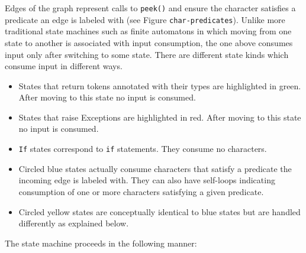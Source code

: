 \begin{itemize}
Edges of the graph represent calls to \texttt{peek()} and ensure the character satisfies a predicate an edge is labeled with (see Figure \texttt{char-predicates}). Unlike more traditional state machines such as finite automatons in which moving from one state to another is associated with input consumption, the one above consumes input only after switching to some state. There are different state kinds which consume input in different ways.
\begin{itemize}
\item States that return tokens annotated with their types are highlighted in green. After moving to this state no input is consumed.
\item States that raise Exceptions are highlighted in red. After moving to this state no input is consumed.
\item \texttt{If} states correspond to \texttt{if} statements. They consume no characters.
\item Circled blue states actually consume characters that satisfy a predicate the incoming edge is labeled with. They can also have self-loops indicating consumption of one or more characters satisfying a given predicate.
\item Circled yellow states are conceptually identical to blue states but are handled differently as explained below.
\end{itemize}

The state machine proceeds in the following manner:


\end{itemize}
